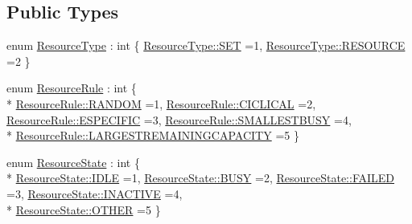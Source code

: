 \subsection*{Public Types}
\begin{DoxyCompactItemize}
\item 
enum \hyperlink{class_resource_aa607c54bf52a9c36b331888ee936a52c}{Resource\+Type} \+: int \{ \hyperlink{class_resource_aa607c54bf52a9c36b331888ee936a52ca8c52684db8f49511e9b44471716bf164}{Resource\+Type\+::\+S\+ET} =1, 
\hyperlink{class_resource_aa607c54bf52a9c36b331888ee936a52ca4f49da9035f276c0947466eb7c42249a}{Resource\+Type\+::\+R\+E\+S\+O\+U\+R\+CE} =2
 \}
\item 
enum \hyperlink{class_resource_afa28dce79d48cbaf6b10f899f2dedfb7}{Resource\+Rule} \+: int \{ \\*
\hyperlink{class_resource_afa28dce79d48cbaf6b10f899f2dedfb7a170e02e86972c2be8559884cc3c12254}{Resource\+Rule\+::\+R\+A\+N\+D\+OM} =1, 
\hyperlink{class_resource_afa28dce79d48cbaf6b10f899f2dedfb7a799276ee6dde6c0ae5c9fb1cacf14531}{Resource\+Rule\+::\+C\+I\+C\+L\+I\+C\+AL} =2, 
\hyperlink{class_resource_afa28dce79d48cbaf6b10f899f2dedfb7af3445810d590ed87cd13c95d4ed17d0a}{Resource\+Rule\+::\+E\+S\+P\+E\+C\+I\+F\+IC} =3, 
\hyperlink{class_resource_afa28dce79d48cbaf6b10f899f2dedfb7a3a3df6d137a401694ba70b55e6ff7305}{Resource\+Rule\+::\+S\+M\+A\+L\+L\+E\+S\+T\+B\+U\+SY} =4, 
\\*
\hyperlink{class_resource_afa28dce79d48cbaf6b10f899f2dedfb7a523a069c516b904643398d8457bf5053}{Resource\+Rule\+::\+L\+A\+R\+G\+E\+S\+T\+R\+E\+M\+A\+I\+N\+I\+N\+G\+C\+A\+P\+A\+C\+I\+TY} =5
 \}
\item 
enum \hyperlink{class_resource_af2224610b59962683d3cafbdac10621a}{Resource\+State} \+: int \{ \\*
\hyperlink{class_resource_af2224610b59962683d3cafbdac10621aaa5daf7f2ebbba4975d61dab1c40188c7}{Resource\+State\+::\+I\+D\+LE} =1, 
\hyperlink{class_resource_af2224610b59962683d3cafbdac10621aa802706a9238e2928077f97736854bad4}{Resource\+State\+::\+B\+U\+SY} =2, 
\hyperlink{class_resource_af2224610b59962683d3cafbdac10621aab9e14d9b2886bcff408b85aefa780419}{Resource\+State\+::\+F\+A\+I\+L\+ED} =3, 
\hyperlink{class_resource_af2224610b59962683d3cafbdac10621aa6b273343c454f9c53dcfc9c4ccf171d2}{Resource\+State\+::\+I\+N\+A\+C\+T\+I\+VE} =4, 
\\*
\hyperlink{class_resource_af2224610b59962683d3cafbdac10621aa03570470bad94692ce93e32700d2e1cb}{Resource\+State\+::\+O\+T\+H\+ER} =5
 \}
\end{DoxyCompactItemize}
